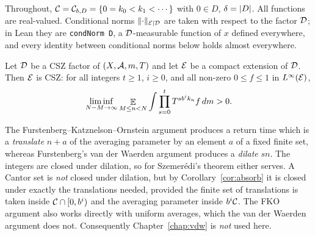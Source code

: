 \label{chap:compact}

Throughout, $\mathcal{C} = \mathcal{C}_{b,D} = \{0=k_0<k_1<\cdots\}$ with $0 \in D$, $\delta = \lvert D \rvert$.
All functions are real-valued.  Conditional norms $\lVert \cdot \rVert_{\mathcal{E} \mid \mathcal{D}}$ are taken with respect to the
factor $\mathcal{D}$; in Lean they are \texttt{condNorm D}, a $\mathcal{D}$-measurable function of $x$ defined
everywhere, and every identity between conditional norms below holds almost everywhere.

\begin{theorem}
  \label{thm:compact-extension}
  \leanok
  Let $\mathcal{D}$ be a CSZ factor of $(X,\mathcal{A},m,T)$ and let $\mathcal{E}$ be a compact extension of $\mathcal{D}$.
  Then $\mathcal{E}$ is CSZ: for all integers $t \geq 1$, $i \geq 0$, and all non-zero
  $0 \leq f \leq 1$ in $L^{\infty}(\mathcal{E})$,
  \begin{equation}
    \label{eq:compact-conclusion}
    \liminf_{N-M \to \infty} \mathop{\mathbb{E}}_{M \leq n < N} \int \prod_{s=0}^{t} T^{s b^i k_n} f \, dm > 0 .
  \end{equation}
\end{theorem}

\begin{remark}
  The Furstenberg--Katznelson--Ornstein argument produces a return time which is a
  \emph{translate} $n+a$ of the averaging parameter by an element $a$ of a fixed finite set,
  whereas Furstenberg's van der Waerden argument produces a \emph{dilate} $sn$.  The integers are
  closed under dilation, so for Szemer\'edi's theorem either serves.  A Cantor set is \emph{not}
  closed under dilation, but by Corollary~\ref{cor:absorb} it is closed under exactly the
  translations needed, provided the finite set of translations is taken inside
  $\mathcal{C} \cap [0,b^i)$ and the averaging parameter inside $b^i \mathcal{C}$.  The FKO argument also
  works directly with uniform averages, which the van der Waerden argument does not.
  Consequently Chapter~\ref{chap:vdw} is \emph{not} used here.
\end{remark}

